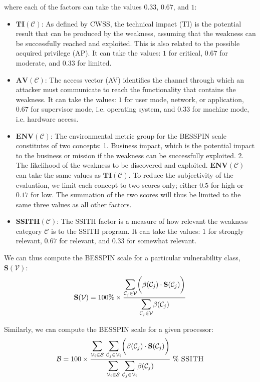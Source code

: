 \documentclass{article}
\begin{document}
where each of the factors can take the values $0.33$, $0.67$, and $1$:
\begin{itemize}
    \item $\mathbf{TI}(\mathcal{C})$: As defined by CWSS, the technical impact (TI) is the potential result that can be produced by the weakness, assuming that the weakness can be successfully reached and exploited. This is also related to the possible acquired privilege (AP). It can take the values: $1$ for critical, $0.67$ for moderate, and $0.33$ for limited.
    \item $\mathbf{AV}(\mathcal{C})$: The access vector (AV) identifies the channel through which an attacker must communicate to reach the functionality that contains the weakness. It can take the values: $1$ for user mode, network, or application, $0.67$ for supervisor mode, i.e. operating system, and $0.33$ for machine mode, i.e. hardware access.
    \item $\mathbf{ENV}(\mathcal{C})$: The environmental metric group for the BESSPIN scale constitutes of two concepts: 1. Business impact, which is the potential impact to the business or mission if the weakness can be successfully exploited. 2. The likelihood of the weakness to be discovered and exploited. $\mathbf{ENV}(\mathcal{C})$ can take the same values as $\mathbf{TI}(\mathcal{C})$. To reduce the subjectivity of the evaluation, we limit each concept to two scores only; either $0.5$ for high or $0.17$ for low. The summation of the two scores will thus be limited to the same three values as all other factors.
    \item $\mathbf{SSITH}(\mathcal{C})$: The SSITH factor is a measure of how relevant the weakness category $\mathcal{C}$ is to the SSITH program. It can take the values: $1$ for strongly relevant, $0.67$ for relevant, and $0.33$ for somewhat relevant. 
\end{itemize} 

We can thus compute the BESSPIN scale for a particular vulnerability class, $\mathbf{S}(\mathcal{V})$:
\begin{equation}
  \mathbf{S}(\mathcal{V}) =
    100\% \times \frac{
      \mathlarger{\mathlarger{\sum}}_{\mathcal{C}_{j} \in \mathcal{V}} \bigg( \beta(\mathcal{C}_{j}) \cdot \mathbf{S}(\mathcal{C}_{j}) \bigg)
    }{
      \mathlarger{\mathlarger{\sum}}_{\mathcal{C}_{j} \in \mathcal{V}} \beta(\mathcal{C}_{j})
    }
\end{equation}

Similarly, we can compute the BESSPIN scale for a given processor:
\begin{equation}
\mathcal{B} =
    100 \times \frac{
      \mathlarger{\mathlarger{\sum}}_{\mathcal{V}_{i} \in \mathcal{S}} \ \mathlarger{\mathlarger{\sum}}_{\mathcal{C}_{j} \in \mathcal{V}_{i}} \bigg( \beta(\mathcal{C}_{j}) \cdot \mathbf{S}(\mathcal{C}_{j}) \bigg)
    }{
      \mathlarger{\mathlarger{\sum}}_{\mathcal{V}_{i} \in \mathcal{S}} \ \mathlarger{\mathlarger{\sum}}_{\mathcal{C}_{j} \in \mathcal{V}_{i}} \beta(\mathcal{C}_{j})
    } \ \% \ \text{\textsc{SSITH}}
\end{equation}
\end{document}
